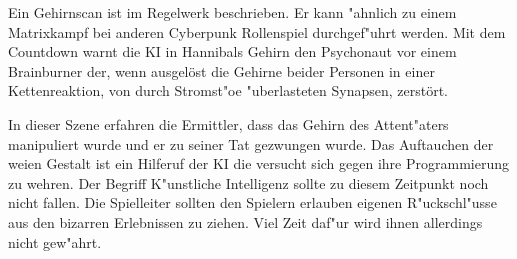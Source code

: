 \begin{remarks}
	Ein Gehirnscan ist im Regelwerk beschrieben. Er kann "ahnlich zu einem Matrixkampf bei anderen Cyberpunk Rollenspiel durchgef"uhrt werden. Mit dem Countdown warnt die KI in Hannibals Gehirn den Psychonaut vor einem Brainburner der, wenn ausgelöst die Gehirne beider Personen in einer Kettenreaktion, von durch Stromst"o\3e "uberlasteten Synapsen, zerstört.

	In dieser Szene erfahren die Ermittler, dass das Gehirn des Attent"aters manipuliert wurde und er zu seiner Tat gezwungen wurde. Das Auftauchen der wei\3en Gestalt ist ein Hilferuf der KI die versucht sich gegen ihre Programmierung zu wehren.	Der Begriff K"unstliche Intelligenz sollte zu diesem Zeitpunkt noch nicht fallen. Die Spielleiter sollten den Spielern erlauben eigenen R"uckschl"usse aus den bizarren Erlebnissen zu ziehen. Viel Zeit daf"ur wird ihnen allerdings nicht gew"ahrt.
\end{remarks}
